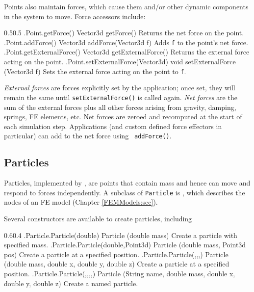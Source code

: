 Points also maintain forces, which cause them and/or other
dynamic components in the system to move. Force accessors include:
%
\begin{methodtable}{0.5}{0.5}
\midline
% 
\methodentry
{\mech.Point.getForce()}%
{Vector3d getForce()}%
{Returns the net force on the point.}%
%
\methodentry
{\mech.Point.addForce()}%
{Vector3d addForce(Vector3d f)}%
{Adds {\tt f} to the point's net force.}%
%
\methodentry
{\mech.Point.getExternalForce()}%
{Vector3d getExternalForce()}%
{Returns the external force acting on the point.}%
%
\methodentry
{\mech.Point.setExternalForce(Vector3d)}%
{void setExternalForce (Vector3d f)}%
{Sets the external force acting on the point to {\tt f}.}%
%
\midline
\end{methodtable}

{\it External forces} are forces explicitly set by the application; once set,
they will remain the same until {\tt setExternalForce()} is called again. {\it
Net forces} are the sum of the external forces plus all other forces arising
from gravity, damping, springs, FE elements, etc. Net forces are zeroed and
recomputed at the start of each simulation step. Applications (and custom
defined force effectors in particular) can add to the net force using {\tt
addForce()}.

\subsection{Particles}

Particles, implemented by
, are
points that contain mass and hence can move and respond to forces
independently. A subclass of {\tt Particle} is
, which describes the nodes
of an FE model (Chapter \ref{FEMModels:sec}).

Several constructors are available to create particles, including
%
\begin{methodtable}{0.6}{0.4}
\midline
% 
\methodentry
{\mech.Particle.Particle(double)}%
{Particle (double mass)}%
{Create a particle with specified mass.}%
%
\methodentry
{\mech.Particle.Particle(double,Point3d)}%
{Particle (double mass, Point3d pos)}%
{Create a particle at a specified position.}%
%
\methodentry
{\mech.Particle.Particle(,,,)}%
{Particle (double mass, double x, double y, double z)}%
{Create a particle at a specified position.}%
%
\methodentry
{\mech.Particle.Particle(,,,,)}%
{Particle (String name, double mass, double x, double y, double z)}%
{Create a named particle.}%
%
\midline
\end{methodtable}
%

